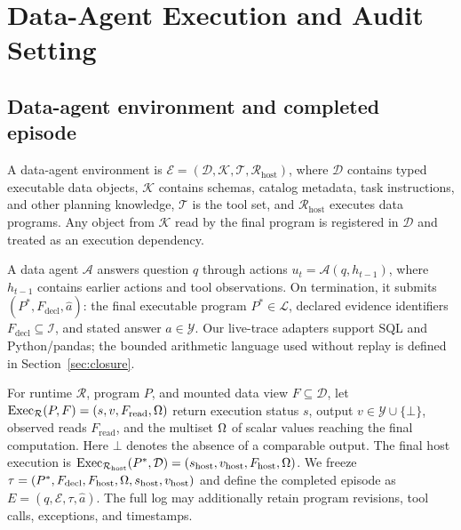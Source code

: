 \section{Data-Agent Execution and Audit Setting}
\label{sec:problem}

\subsection{Data-agent environment and completed episode}
\label{sec:episode}

A data-agent environment is
$\mathcal E=(\mathcal D,\mathcal K,\mathcal T,
\mathcal R_{\mathrm{host}})$, where $\mathcal D$ contains typed
executable data objects, $\mathcal K$ contains schemas, catalog metadata,
task instructions, and other planning knowledge, $\mathcal T$ is the tool
set, and $\mathcal R_{\mathrm{host}}$ executes data programs. Any object
from $\mathcal K$ read by the final program is registered in $\mathcal D$
and treated as an execution dependency.

A data agent $\mathcal A$ answers question $q$ through actions
$u_t=\mathcal A(q,h_{t-1})$, where $h_{t-1}$ contains earlier actions and
tool observations. On termination, it submits
$(P^*,F_{\mathrm{decl}},\hat a)$: the final executable program
$P^*\in\mathcal L$, declared evidence identifiers
$F_{\mathrm{decl}}\subseteq\mathcal I$, and stated answer
$\hat a\in\mathcal Y$. Our live-trace adapters support SQL and
Python/pandas; the bounded arithmetic language used without replay is
defined in Section~\ref{sec:closure}.

For runtime $\mathcal R$, program $P$, and mounted data view
$F\subseteq\mathcal D$, let
$\operatorname{Exec}_{\mathcal R}(P,F)
=(s,v,F_{\mathrm{read}},\Omega)$ return execution status $s$, output
$v\in\mathcal Y\cup\{\bot\}$, observed reads $F_{\mathrm{read}}$, and the
multiset $\Omega$ of scalar values reaching the final computation.
Here $\bot$ denotes the absence of a comparable output. The final host
execution is
$\operatorname{Exec}_{\mathcal R_{\mathrm{host}}}(P^*,\mathcal D)
=(s_{\mathrm{host}},v_{\mathrm{host}},F_{\mathrm{host}},\Omega)$.
We freeze
$\tau=(P^*,F_{\mathrm{decl}},F_{\mathrm{host}},\Omega,
 s_{\mathrm{host}},v_{\mathrm{host}})$ and define the completed episode as
$E=(q,\mathcal E,\tau,\hat a)$. The full log may additionally retain
program revisions, tool calls, exceptions, and timestamps.

